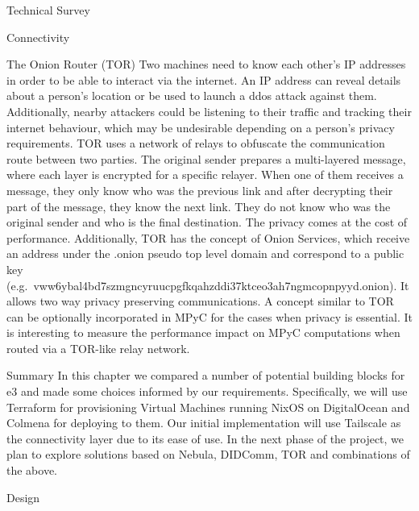 \begin{frame}{Technical Survey}
\begin{block}{Connectivity}
\begin{block}{The Onion Router (TOR)}
\protect\hypertarget{the-onion-router-tor}{}
Two machines need to know each other's IP addresses in order to be able
to interact via the internet. An IP address can reveal details about a
person's location or be used to launch a \gls{ddos} attack against them.
Additionally, nearby attackers could be listening to their traffic and
tracking their internet behaviour, which may be undesirable depending on
a person's privacy requirements. TOR uses a network of relays to
obfuscate the communication route between two parties. The original
sender prepares a multi-layered message, where each layer is encrypted
for a specific relayer. When one of them receives a message, they only
know who was the previous link and after decrypting their part of the
message, they know the next link. They do not know who was the original
sender and who is the final destination. The privacy comes at the cost
of performance. Additionally, TOR has the concept of Onion Services,
which receive an address under the .onion pseudo top level domain and
correspond to a public key
(e.g.~vww6ybal4bd7szmgncyruucpgfkqahzddi37ktceo3ah7ngmcopnpyyd.onion).
It allows two way privacy preserving communications. A concept similar
to TOR can be optionally incorporated in MPyC for the cases when privacy
is essential. It is interesting to measure the performance impact on
MPyC computations when routed via a TOR-like relay network.
\end{block}
\end{block}

\begin{block}{Summary}
\protect\hypertarget{summary}{}
In this chapter we compared a number of potential building blocks for
\gls{e3} and made some choices informed by our requirements.
Specifically, we will use Terraform for provisioning Virtual Machines
running NixOS on DigitalOcean and Colmena for deploying to them. Our
initial implementation will use Tailscale as the connectivity layer due
to its ease of use. In the next phase of the project, we plan to explore
solutions based on Nebula, DIDComm, TOR and combinations of the above.
\end{block}
\end{frame}

\begin{frame}{Design}
\protect\hypertarget{design}{}
\begin{block}{}
\protect\hypertarget{section}{}
\end{block}
\end{frame}


